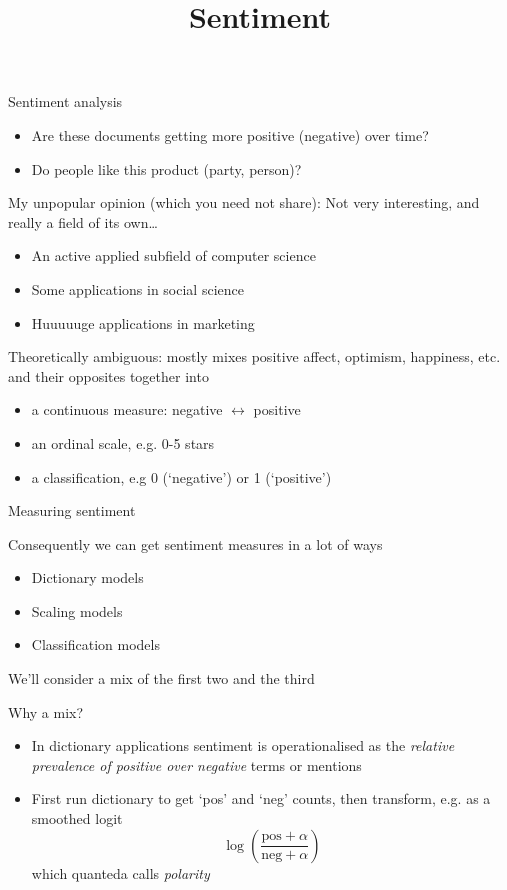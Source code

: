 \documentclass{hertieteaching}
\title{Sentiment}
\begin{document}
\maketitle

\begin{frame}{Sentiment analysis}

\begin{itemize}
  \item Are these documents getting more positive (negative) over time?
  \item Do people like this product (party, person)?
\end{itemize}

My unpopular opinion (which you need not share): Not very interesting, and really a field of its own\ldots
\begin{itemize}
  \item An active applied subfield of computer science
  \item Some applications in social science
  \item Huuuuuge applications in marketing
\end{itemize}

\pause

Theoretically ambiguous: mostly mixes positive affect, optimism, happiness, etc. and their opposites together into
\begin{itemize}
  \item a continuous measure: negative $\longleftrightarrow$ positive
  \item an ordinal scale, e.g. 0-5 stars
  \item a classification, e.g 0 (`negative') or 1 (`positive')
\end{itemize}
\end{frame}

\begin{frame}{Measuring sentiment}

Consequently we can get sentiment measures in a lot of ways
\begin{itemize}
  \item Dictionary models
  \item Scaling models
  \item Classification models
\end{itemize}
We'll consider a mix of the first two and the third

Why a mix?
\begin{itemize}
  \item In dictionary applications sentiment is operationalised as the \textit{relative prevalence of positive over negative} terms or mentions
  \item First run dictionary to get `pos' and `neg' counts, then transform, e.g. as a smoothed logit 
$$
\log\left(\frac{\text{pos} + \alpha}{\text{neg} + \alpha}\right)
$$
which \textsf{quanteda} calls \textit{polarity}
\end{itemize}

\end{frame}
\end{document}
